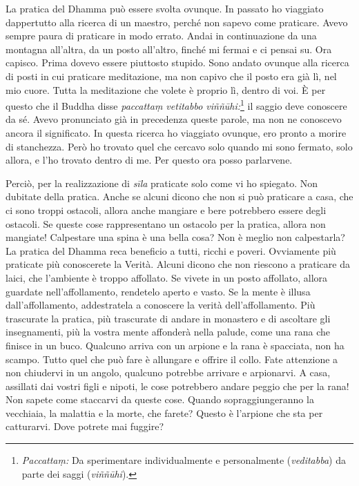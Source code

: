 La pratica del Dhamma può essere svolta ovunque. In passato ho viaggiato
dappertutto alla ricerca di un maestro, perché non sapevo come
praticare. Avevo sempre paura di praticare in modo errato. Andai in
continuazione da una montagna all'altra, da un posto all'altro, finché
mi fermai e ci pensai su. Ora capisco. Prima dovevo essere piuttosto
stupido. Sono andato ovunque alla ricerca di posti in cui praticare
meditazione, ma non capivo che il posto era già lì, nel mio cuore. Tutta
la meditazione che volete è proprio lì, dentro di voi. È per questo che
il Buddha disse \emph{paccattaṃ vetitabbo viññūhi:}\footnote{\emph{Paccattaṃ:}
  Da sperimentare individualmente e personalmente (\emph{veditabba}) da
  parte dei saggi (\emph{viññūhi}).} il saggio deve conoscere da sé.
Avevo pronunciato già in precedenza queste parole, ma non ne conoscevo
ancora il significato. In questa ricerca ho viaggiato ovunque, ero
pronto a morire di stanchezza. Però ho trovato quel che cercavo solo
quando mi sono fermato, solo allora, e l'ho trovato dentro di me. Per
questo ora posso parlarvene.

Perciò, per la realizzazione di \emph{sīla} praticate solo come vi ho
spiegato. Non dubitate della pratica. Anche se alcuni dicono che non si
può praticare a casa, che ci sono troppi ostacoli, allora anche mangiare
e bere potrebbero essere degli ostacoli. Se queste cose rappresentano un
ostacolo per la pratica, allora non mangiate! Calpestare una spina è una
bella cosa? Non è meglio non calpestarla? La pratica del Dhamma reca
beneficio a tutti, ricchi e poveri. Ovviamente più praticate più
conoscerete la Verità. Alcuni dicono che non riescono a praticare da
laici, che l'ambiente è troppo affollato. Se vivete in un posto
affollato, allora guardate nell'affollamento, rendetelo aperto e vasto.
Se la mente è illusa dall'affollamento, addestratela a conoscere la
verità dell'affollamento. Più trascurate la pratica, più trascurate di
andare in monastero e di ascoltare gli insegnamenti, più la vostra mente
affonderà nella palude, come una rana che finisce in un buco. Qualcuno
arriva con un arpione e la rana è spacciata, non ha scampo. Tutto quel
che può fare è allungare e offrire il collo. Fate attenzione a non
chiudervi in un angolo, qualcuno potrebbe arrivare e arpionarvi. A casa,
assillati dai vostri figli e nipoti, le cose potrebbero andare peggio
che per la rana! Non sapete come staccarvi da queste cose. Quando
sopraggiungeranno la vecchiaia, la malattia e la morte, che farete?
Questo è l'arpione che sta per catturarvi. Dove potrete mai fuggire?

